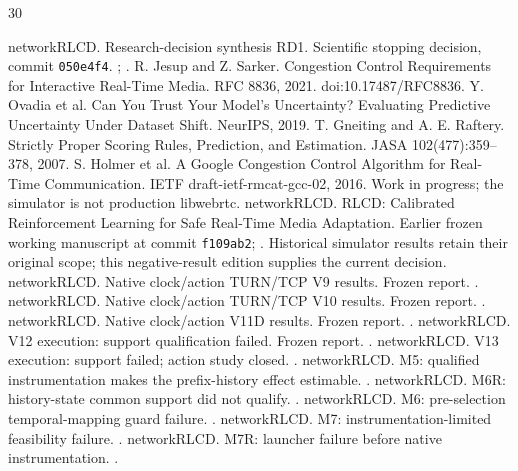 \begin{thebibliography}{30}
\raggedright
{} networkRLCD. Research-decision synthesis RD1. Scientific stopping
decision, commit \texttt{050e4f4}.
;
.
 R. Jesup and Z. Sarker. Congestion Control Requirements for
Interactive Real-Time Media. RFC 8836, 2021. doi:10.17487/RFC8836.
 Y. Ovadia et al. Can You Trust Your Model's Uncertainty?
Evaluating Predictive Uncertainty Under Dataset Shift. NeurIPS, 2019.
 T. Gneiting and A. E. Raftery. Strictly Proper Scoring Rules,
Prediction, and Estimation. JASA 102(477):359--378, 2007.
 S. Holmer et al. A Google Congestion Control Algorithm for
Real-Time Communication. IETF draft-ietf-rmcat-gcc-02, 2016. Work in progress;
the simulator is not production libwebrtc.
 networkRLCD. RLCD: Calibrated Reinforcement Learning for Safe
Real-Time Media Adaptation. Earlier frozen working manuscript at commit
\texttt{f109ab2}; . Historical simulator results retain their
original scope; this negative-result edition supplies the current decision.
 networkRLCD. Native clock/action TURN/TCP V9 results. Frozen report.
.
 networkRLCD. Native clock/action TURN/TCP V10 results. Frozen report.
.
 networkRLCD. Native clock/action V11D results. Frozen report.
.
 networkRLCD. V12 execution: support qualification failed. Frozen report.
.
 networkRLCD. V13 execution: support failed; action study closed.
.
 networkRLCD. M5: qualified instrumentation makes the prefix-history
effect estimable. .
 networkRLCD. M6R: history-state common support did not qualify.
.
 networkRLCD. M6: pre-selection temporal-mapping guard failure.
.
 networkRLCD. M7: instrumentation-limited feasibility failure.
.
 networkRLCD. M7R: launcher failure before native instrumentation.
.

\end{thebibliography}
